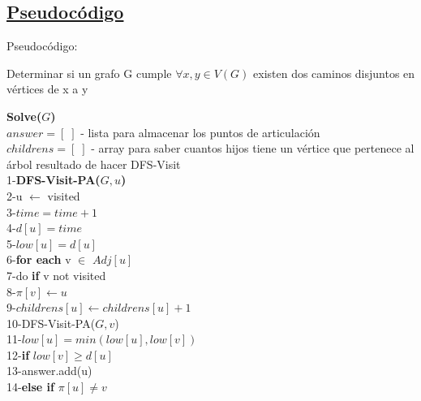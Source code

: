 \documentclass{article}
\begin{document}
    \subsection{\underline{Pseudoc\'odigo}}
    
    \begin{algorithm}[H] 
        Pseudoc\'odigo:
        \caption{Determinar si un grafo G cumple $\forall x,y\in V(G)$  existen dos caminos disjuntos en v\'ertices de x a y }
        \textbf{Solve($G$)\\}
        $answer=[\;]$ - lista para almacenar los puntos de articulaci\'on\\
        $childrens=[\;]$ - array para saber cuantos hijos tiene un v\'ertice que pertenece al \'arbol resultado de hacer DFS-Visit\\
        1-\hspace*{1em}\noindent \textbf{DFS-Visit-PA($G,u$)} \\ 
        2-\hspace*{2em}u $\leftarrow$ visited \\
        3-\hspace*{2em}$time=time+1$ \\
        4-\hspace*{2em}$d[u]=time$\\
        5-\hspace*{2em}$low[u]=d[u]$\\ 
        6-\hspace*{2em}\noindent \textbf{for each} v $\in$ $Adj[u]$\\
        7-\hspace*{3em}do \noindent \textbf{if} v not visited\\
        8-\hspace*{4em}$\pi[v] \leftarrow u$\\
        9-\hspace*{4em}$childrens[u] \leftarrow childrens[u]+1$\\
        10-\hspace*{4em}DFS-Visit-PA($G,v$)\\
        11-\hspace*{4em}$low[u]=min(low[u],low[v])$\\
        12-\hspace*{4em}\noindent \textbf{if} $low[v]\ge d[u]$\\
        13-\hspace*{5em}answer.add(u)\\
        14-\hspace*{3em}\noindent \textbf{else if} $\pi[u]\ne v$\\

\end{algorithm}
\end{document}

